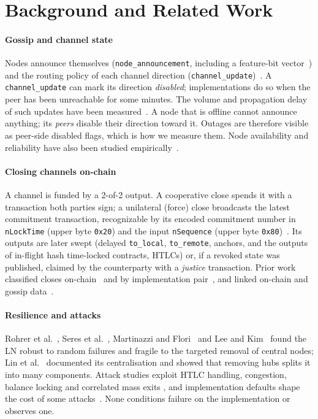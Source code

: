 \documentclass[conference]{IEEEtran}
\begin{document}
\section{Background and Related Work}
\label{sec:background}

\paragraph*{Gossip and channel state}
Nodes announce themselves (\texttt{node\_announcement}, including a feature-bit vector~\cite{bolt9}) and the
routing policy of each channel direction (\texttt{channel\_update})~\cite{bolt7}. A \texttt{channel\_update} can
mark its direction \emph{disabled}; implementations do so when the peer has been unreachable for some minutes.
The volume and propagation delay of such updates have been measured~\cite{gogge2023convergence}. A node that is
offline cannot announce anything; its \emph{peers} disable their direction toward it. Outages are therefore visible
as peer-side disabled flags, which is how we measure them. Node availability and reliability have also been
studied empirically~\cite{waugh2020availability}.

\paragraph*{Closing channels on-chain}
A channel is funded by a 2-of-2 output. A cooperative close spends it with a transaction both parties sign; a
unilateral (force) close broadcasts the latest commitment transaction, recognizable by its encoded commitment
number in \texttt{nLockTime} (upper byte \texttt{0x20}) and the input \texttt{nSequence} (upper byte
\texttt{0x80})~\cite{bolt3}. Its outputs are later swept (delayed \texttt{to\_local}, \texttt{to\_remote},
anchors, and the outputs of in-flight hash time-locked contracts, HTLCs) or, if a revoked state was published, claimed by the counterparty with a \emph{justice}
transaction. Prior work classified closes on-chain~\cite{grotschla2025lifecycle} and by implementation
pair~\cite{zabka2022empirical}, and linked on-chain and gossip data~\cite{kappos2021empirical,romiti2021crosslayer}.

\paragraph*{Resilience and attacks}
Rohrer et al.~\cite{rohrer2019discharged}, Seres et al.~\cite{seres2020topological}, Martinazzi and
Flori~\cite{martinazzi2020evolving} and Lee and Kim~\cite{lee2020robustness} found the LN robust to random
failures and fragile to the targeted removal of central nodes; Lin et al.~\cite{lin2020lightning} documented its
centralisation and showed that removing hubs splits it into many components. Attack studies exploit HTLC
handling, congestion, balance locking and correlated mass exits
\cite{harris2020flood,mizrahi2021congestion,perez2020lockdown,sguanci2023massexit}, and implementation defaults
shape the cost of some attacks~\cite{tikhomirov2020quantitative}. None conditions failure on the implementation or
observes one.
\end{document}

